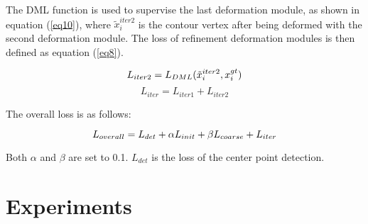 \documentclass[10pt,twocolumn,letterpaper]{article}
\begin{document}
The DML function is used to supervise the last deformation module, as shown in equation (\ref{eq10}), where $\tilde{x}_{i}^{iter2}$ is the contour vertex after being deformed with the second deformation module. The loss of refinement deformation modules is then defined as equation (\ref{eq8}).
\begin{small}
\begin{equation}\vspace{-3mm}
L_{iter2} = L_{DML}(\tilde{x}_{i}^{iter2}, x_{i}^{gt}) \label{eq10}
\end{equation}\vspace{-3mm}
\begin{equation}
L_{iter} = L_{iter1} + L_{iter2} \label{eq8}
\end{equation}
\end{small}The overall loss is as follows:\vspace{-3mm}
\begin{small}
\begin{equation}\vspace{-3mm}
L_{overall} = L_{det} + \alpha L_{init} + \beta L_{coarse} + L_{iter} \label{eq11}
\end{equation}
\end{small}\vspace{-1mm}Both $\alpha$ and $\beta$ are set to 0.1. $L_{det}$ is the loss of the center point detection.

\section{Experiments}
\label{sec:experiments}
\end{document}
